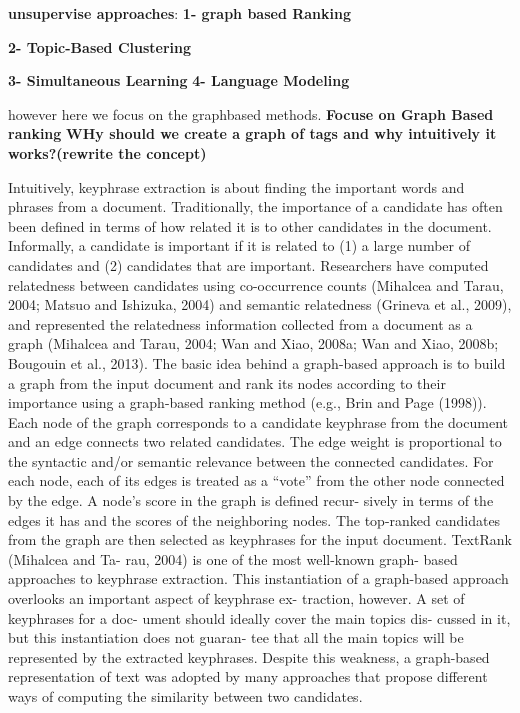 \textbf{unsupervise approaches}:\newline
\textbf{1- graph based Ranking}

\textbf{2- Topic-Based Clustering}

\textbf{3- Simultaneous Learning}
\textbf{4- Language Modeling}
\cite{KeyphraseSurvey}


however here we focus on the graphbased methods.
\textbf{Focuse on Graph Based ranking}
\textbf{WHy should we create a graph of tags and why intuitively it works?(rewrite the concept)}

Intuitively, keyphrase extraction is about finding the important words and phrases from a document. Traditionally, the importance of a candidate has often been defined in terms of how related it is to other candidates in the document. Informally, a candidate is important if it is related to (1) a large number of candidates and (2) candidates that are important. Researchers have computed relatedness between candidates using co-occurrence counts (Mihalcea and Tarau, 2004; Matsuo and Ishizuka, 2004) and semantic relatedness (Grineva et al., 2009), and represented the relatedness information collected from a document as a graph (Mihalcea and Tarau, 2004; Wan and Xiao, 2008a; Wan and Xiao, 2008b; Bougouin et al., 2013).\cite{KeyphraseSurvey}
The basic idea behind a graph-based approach is to build a graph from the input document and rank its nodes according to their importance using a graph-based ranking method (e.g., Brin and Page (1998)). Each node of the graph corresponds to a candidate keyphrase from the document and an edge connects two related candidates. The edge weight is proportional to the syntactic and/or semantic relevance between the connected candidates. For each node, each of its edges is treated as a “vote” from the other node connected by the edge. A node’s score in the graph is defined recur- sively in terms of the edges it has and the scores of the neighboring nodes. The top-ranked candidates from the graph are then selected as keyphrases for the input document. TextRank (Mihalcea and Ta- rau, 2004) is one of the most well-known graph- based approaches to keyphrase extraction.
This instantiation of a graph-based approach overlooks an important aspect of keyphrase ex- traction, however. A set of keyphrases for a doc- ument should ideally cover the main topics dis- cussed in it, but this instantiation does not guaran- tee that all the main topics will be represented by the extracted keyphrases. Despite this weakness, a graph-based representation of text was adopted by many approaches that propose different ways of computing the similarity between two candidates.\cite{KeyphraseSurvey}





